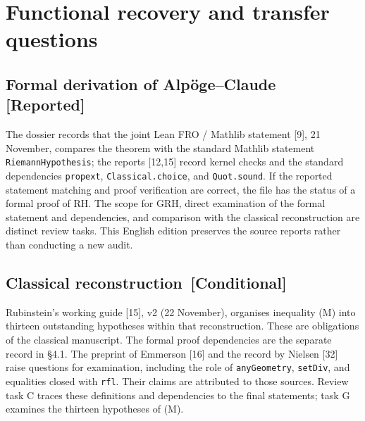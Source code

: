 \documentclass[11pt,a4paper]{article}
\newcommand{\estatuto}[1]{{\normalfont\small\color{tag}\,[#1]}}
\begin{document}
\section{Functional recovery and transfer questions}
\subsection{Formal derivation of Alpöge--Claude \estatuto{Reported}}
The dossier records that the joint Lean FRO / Mathlib statement [9], 21 November, compares the theorem with the standard Mathlib statement \texttt{RiemannHypothesis}; the reports [12,15] record kernel checks and the standard dependencies \texttt{propext}, \texttt{Classical.choice}, and \texttt{Quot.sound}. If the reported statement matching and proof verification are correct, the file has the status of a formal proof of RH. The scope for GRH, direct examination of the formal statement and dependencies, and comparison with the classical reconstruction are distinct review tasks. This English edition preserves the source reports rather than conducting a new audit.
\subsection{Classical reconstruction \estatuto{Conditional}}
Rubinstein's working guide [15], v2 (22 November), organises inequality (M) into thirteen outstanding hypotheses within that reconstruction. These are obligations of the classical manuscript. The formal proof dependencies are the separate record in §4.1. The preprint of Emmerson [16] and the record by Nielsen [32] raise questions for examination, including the role of \texttt{anyGeometry}, \texttt{setDiv}, and equalities closed with \texttt{rfl}. Their claims are attributed to those sources. Review task C traces these definitions and dependencies to the final statements; task G examines the thirteen hypotheses of (M).
\end{document}
